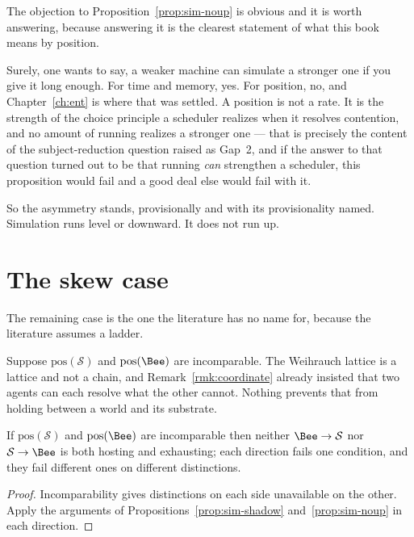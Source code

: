 \begin{remark}
\label{rmk:sim-notspeed}
The objection to Proposition~\ref{prop:sim-noup} is obvious and it is
worth answering, because answering it is the clearest statement of what
this book means by position.

Surely, one wants to say, a weaker machine can simulate a stronger one
if you give it long enough.
For time and memory, yes.
For position, no, and Chapter~\ref{ch:ent} is where that was settled.
A position is not a rate.
It is the strength of the choice principle a scheduler realizes when it
resolves contention, and no amount of running realizes a stronger one ---
that is precisely the content of the subject-reduction question raised as
Gap~2, and if the answer to that question turned out to be that running
\emph{can} strengthen a scheduler, this proposition would fail and a good
deal else would fail with it.

So the asymmetry stands, provisionally and with its provisionality
named.
Simulation runs level or downward.
It does not run up.
\end{remark}

\section{The skew case}
\label{sec:sim-skew}

The remaining case is the one the literature has no name for, because the
literature assumes a ladder.

Suppose $\mathrm{pos}(\mathcal{S})$ and $\mathrm{pos}(\Bee)$ are
incomparable.
The Weihrauch lattice is a lattice and not a chain, and
Remark~\ref{rmk:coordinate} already insisted that two agents can each
resolve what the other cannot.
Nothing prevents that from holding between a world and its substrate.

\begin{proposition}
\label{prop:sim-skew}
If $\mathrm{pos}(\mathcal{S})$ and $\mathrm{pos}(\Bee)$ are incomparable
then neither $\Bee \to \mathcal{S}$ nor $\mathcal{S} \to \Bee$ is both
hosting and exhausting; each direction fails one condition, and they fail
different ones on different distinctions.
\end{proposition}

\begin{proof}
Incomparability gives distinctions on each side unavailable on the other.
Apply the arguments of Propositions~\ref{prop:sim-shadow}
and~\ref{prop:sim-noup} in each direction.
\end{proof}

